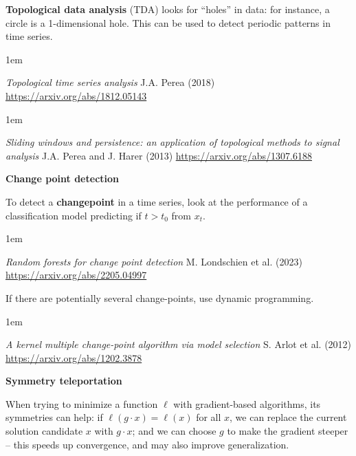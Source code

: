 \documentclass[a5paper]{article}
\let\d\textbf
\newenvironment{reference}{%
  \medskip\goodbreak
  \parskip 0pt
  \raggedright
  \leftskip 1em
  \obeylines
}{\par\medskip\goodbreak}
\def\section#1{\clearpage{\vspace*{0cm}\LARGE\centering\bfseries #1\par\bigskip\bigskip}}
\def\subsection#1{{\par\bigskip\goodbreak\large\bfseries #1\par}}
\begin{document}
\d{Topological data analysis} (TDA) looks for ``holes'' in data:
for instance, a circle is a 1-dimensional hole.
This can be used to detect periodic patterns in time series.

\begin{reference}
  \emph{Topological time series analysis}
  J.A. Perea (2018)
  \url{https://arxiv.org/abs/1812.05143}
\end{reference}

\begin{reference}
  \emph{Sliding windows and persistence: an application of topological methods to signal analysis}
  J.A. Perea and J. Harer (2013)
  \url{https://arxiv.org/abs/1307.6188}
\end{reference}

\subsection{Change point detection}

To detect a \d{changepoint} in a time series,
look at the performance of a classification model
predicting if $t>t_0$ from $x_t$.

\begin{reference}
  \emph{Random forests for change point detection}
  M. Londschien et al. (2023)
  \url{https://arxiv.org/abs/2205.04997}
\end{reference}

If there are potentially several change-points, use dynamic programming.

\begin{reference}
  \emph{A kernel multiple change-point algorithm via model selection}
  S. Arlot et al. (2012)
  \url{https://arxiv.org/abs/1202.3878}
\end{reference}

\section{Optimization}

\subsection{Symmetry teleportation}

When trying to minimize a function $\ell$ with gradient-based algorithms,
its symmetries can help: if $\ell(g\cdot x) = \ell(x)$ for all $x$,
we can replace the current solution candidate $x$ with $g \cdot x$; 
and we can choose $g$ to make the gradient steeper --
this speeds up convergence, and may also improve generalization.
\end{document}

